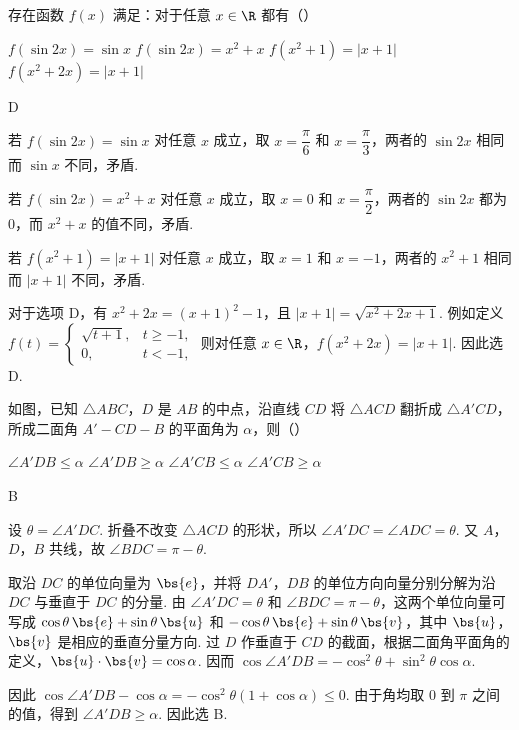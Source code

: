 \begin{problem}
存在函数 \( f(x) \) 满足：对于任意 \( x \in \R \) 都有（\quad）

\choices
    {\(f(\sin 2x) = \sin x\)}
    {\(f(\sin 2x) = x^2 + x\)}
    {\(f(x^{2} + 1) = |x + 1|\)}
    {\(f(x^{2} + 2x) = |x + 1|\)}
\end{problem}

\begin{answer}
D
\end{answer}

\begin{solution}
若 \(f(\sin2x)=\sin x\) 对任意 \(x\) 成立，取 \(x=\dfrac{\pi}{6}\) 和 \(x=\dfrac{\pi}{3}\)，两者的 \(\sin2x\) 相同而 \(\sin x\) 不同，矛盾.

若 \(f(\sin2x)=x^2+x\) 对任意 \(x\) 成立，取 \(x=0\) 和 \(x=\dfrac{\pi}{2}\)，两者的 \(\sin2x\) 都为 \(0\)，而 \(x^2+x\) 的值不同，矛盾.

若 \(f(x^2+1)=|x+1|\) 对任意 \(x\) 成立，取 \(x=1\) 和 \(x=-1\)，两者的 \(x^2+1\) 相同而 \(|x+1|\) 不同，矛盾.

对于选项 D，有 \(x^2+2x=(x+1)^2-1\)，且 \(|x+1|=\sqrt{x^2+2x+1}\). 例如定义
\(f(t)=\begin{cases}
\sqrt{t+1},&t\geqslant-1,\\
0,&t<-1,
\end{cases}\)
则对任意 \(x\in\R\)，\(f(x^2+2x)=|x+1|\). 因此选 D.
\end{solution}

\begin{problem}
如图，已知 \(\triangle ABC\)，\(D\) 是 \(AB\) 的中点，沿直线 \(CD\) 将 \(\triangle ACD\) 翻折成 \(\triangle A'CD\)，所成二面角 \(A' - CD - B\) 的平面角为 \(\alpha\)，则（\quad）


\choices
    {\(\angle A'DB \leqslant \alpha\)}
    {\(\angle A'DB \geqslant \alpha\)}
    {\(\angle A'CB \leqslant \alpha\)}
    {\(\angle A'CB \geqslant \alpha\)}
\end{problem}

\begin{answer}
B
\end{answer}

\begin{solution}
设 \(\theta=\angle A'DC\). 折叠不改变 \(\triangle ACD\) 的形状，所以 \(\angle A'DC=\angle ADC=\theta\). 又 \(A\)，\(D\)，\(B\) 共线，故 \(\angle BDC=\pi-\theta\).

取沿 \(DC\) 的单位向量为 \(\bs{e}\)，并将 \(DA'\)，\(DB\) 的单位方向向量分别分解为沿 \(DC\) 与垂直于 \(DC\) 的分量. 由 \(\angle A'DC=\theta\) 和 \(\angle BDC=\pi-\theta\)，这两个单位向量可写成
\(\cos\theta\,\bs{e}+\sin\theta\,\bs{u}\) 和 \(-\cos\theta\,\bs{e}+\sin\theta\,\bs{v}\)，其中 \(\bs{u}\)，\(\bs{v}\) 是相应的垂直分量方向. 过 \(D\) 作垂直于 \(CD\) 的截面，根据二面角平面角的定义，\(\bs{u}\cdot\bs{v}=\cos\alpha\). 因而
\(\cos\angle A'DB=-\cos^2\theta+\sin^2\theta\cos\alpha\).

因此
\(\cos\angle A'DB-\cos\alpha=-\cos^2\theta(1+\cos\alpha)\leqslant0\). 由于角均取 \(0\) 到 \(\pi\) 之间的值，得到 \(\angle A'DB\geqslant\alpha\). 因此选 B.
\end{solution}

